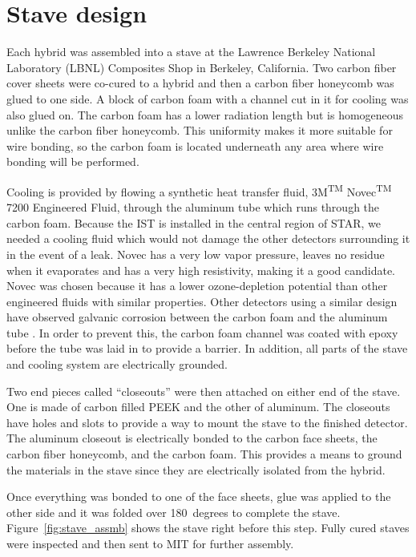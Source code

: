 \documentclass[preprint,12pt]{elsarticle}
\begin{document}
\section{Stave design}
Each hybrid was assembled into a stave at the Lawrence Berkeley National Laboratory (LBNL) Composites Shop in Berkeley,
California. Two carbon fiber cover sheets were co-cured to a hybrid and then a
carbon fiber honeycomb was glued to one side. A block of carbon foam with a
channel cut in it for cooling was also glued on. The carbon foam has a lower
radiation length but is homogeneous unlike the carbon fiber honeycomb. This
uniformity makes it more suitable for wire bonding, so the carbon foam is
located underneath any area where wire bonding will be performed.

Cooling is provided by flowing a synthetic heat transfer fluid, 3M\textsuperscript{TM}
Novec\textsuperscript{TM} 7200 Engineered Fluid,
through the aluminum tube which runs through the carbon
foam. Because the IST is installed in the central region of STAR, we needed a
cooling fluid which would not damage the other detectors surrounding it in the
event of a leak. Novec has a very low vapor pressure, leaves no residue when it
evaporates and has a very high resistivity, making it a good candidate. Novec was chosen because it has a
lower ozone-depletion potential than other engineered fluids with similar
properties.  Other detectors using a similar design have observed galvanic corrosion
between the carbon foam and the aluminum tube \cite{ref:novec}. In order to prevent this, the
carbon foam channel was coated with epoxy before the tube was laid in to provide a
barrier. In addition, all parts of the stave and cooling system are
electrically grounded.

Two end pieces called ``closeouts'' were then attached on either end of the stave. One
is made of carbon filled PEEK and the other of aluminum. The closeouts have
holes and slots to provide a way to mount the stave to the finished detector. The
aluminum closeout is electrically bonded to the carbon face sheets, the carbon
fiber honeycomb, and the carbon foam. This provides a means to ground the
materials in the stave since they are electrically isolated from the hybrid.

Once everything was bonded to one of the face sheets, glue was applied to
the other side and it was folded over 180~degrees to complete the stave.
Figure~\ref{fig:stave_assmb} shows the stave right before this step. Fully
cured staves were inspected and then sent to MIT for further assembly.
\end{document}
